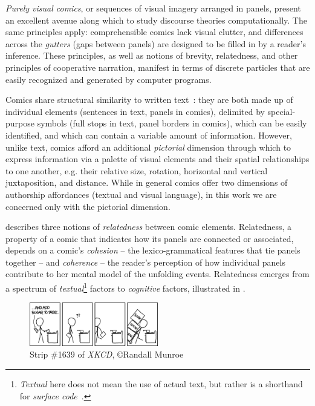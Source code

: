 
{\em Purely visual comics}, or sequences of visual imagery arranged in
panels, present an excellent avenue along which to study discourse
theories computationally. 
The same principles apply: comprehensible comics
lack visual clutter, and differences across the {\em gutters} (gaps between
panels) are designed to be filled in by a reader's inference.
These principles, as well as notions of brevity, relatedness, and other
principles of cooperative narration, manifest in terms of discrete
particles that are easily recognized and generated by computer programs. 

Comics share structural similarity to written
text~\cite{saraceni2016relatedness}: they are both made up of individual
elements (sentences in text, panels in comics), delimited by special-purpose
symbols (full stops in text, panel borders in comics), which can be easily
identified, and which can contain a variable amount of information. However,
unlike text, comics afford an additional \emph{pictorial} dimension through
which to express information via a palette of visual elements and their spatial
relationships to one another, e.g. their relative size, rotation, horizontal and
vertical juxtaposition, and distance. While in general comics offer two
dimensions of authorship affordances (textual and visual language), in this work
we are concerned only with the pictorial dimension.

\citeauthor{saraceni2016relatedness} describes three notions of
\emph{relatedness} between comic elements.
Relatedness, a property of a comic that indicates how its panels are
connected or associated, depends on a comic's \emph{cohesion} -- the
lexico-grammatical features that tie panels together -- and \emph{coherence} --
the reader's perception of how individual panels contribute to her mental model
of the unfolding events. Relatedness emerges from a spectrum of \emph{textual}\footnote{\emph{Textual} here does not mean the use of actual text, but rather is a shorthand for \emph{surface code}~\cite{zwaan1998situation}.}
factors to \emph{cognitive} factors, illustrated in .
%
%

\begin{figure}
\includegraphics[width=0.5\textwidth]{xkcd-to_taste.png}
\caption{Strip \#1639 of {\em XKCD},
  \copyright Randall Munroe}
\label{fig:xkcd}
\end{figure}


